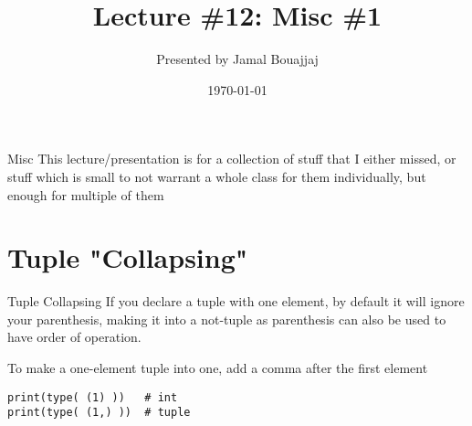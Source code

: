 %
%



\title{Lecture \#12: Misc \#1}
\date{\today}
\author{Presented by Jamal Bouajjaj}

\makeatletter
{}%
\makeatother



\maketitle

\begin{frame}{Misc}
  This lecture/presentation is for a collection of stuff that I either missed, or stuff which is small to not warrant a whole class for them individually, but enough for multiple of them
\end{frame}

\section{Tuple "Collapsing"}
\begin{frame}[containsverbatim]{Tuple Collapsing}
  If you declare a tuple with one element, by default it will ignore your parenthesis, making it into a not-tuple as parenthesis can also be used to have order of operation.

  To make a one-element tuple into one, add a comma after the first element
  \begin{verbatim}
print(type( (1) ))   # int
print(type( (1,) ))  # tuple
  \end{verbatim}
\end{frame}

